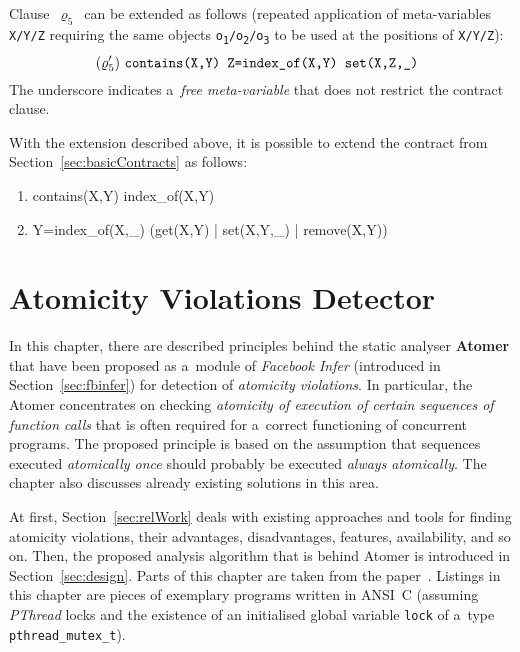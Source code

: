 Clause~$ \varrho_5 $~can be extended as follows (repeated application of
meta-variables \texttt{X/Y/Z} requiring the same objects
\texttt{o\textsubscript{1}/o\textsubscript{2}/o\textsubscript{3}} to be used
at the positions of \texttt{X/Y/Z}):
$$
    (\varrho'_5)\ \text{\texttt{%
        contains(X,Y) Z=index\_of(X,Y) set(X,Z,\_)
    }}
$$
The underscore indicates a~\emph{free meta-variable} that does not restrict
the contract clause.

With the extension described above, it is possible to extend the contract
from Section~\ref{sec:basicContracts} as follows:
\begin{enumerate}[label={$ (\varrho'_{\arabic*}) $}]
    \tt

    \item contains(X,Y) index\_of(X,Y)
    \item Y=index\_of(X,\_) (get(X,Y) | set(X,Y,\_) | remove(X,Y))
\end{enumerate}



\chapter{Atomicity Violations Detector}
\label{chap:proposal}

In this chapter, there are described principles behind the static analyser
\textbf{Atomer} that have been proposed as a~module of \emph{Facebook
Infer} (introduced in Section~\ref{sec:fbinfer}) for detection of
\emph{atomicity violations}. In particular, the Atomer concentrates on
checking \emph{atomicity of execution of certain sequences of function
calls} that is often required for a~correct functioning of concurrent
programs. The proposed principle is based on the assumption that sequences
executed \emph{atomically once} should probably be executed \emph{always
atomically}. The chapter also discusses already existing solutions in this
area.

At first, Section~\ref{sec:relWork} deals with
existing approaches and tools for finding atomicity violations, their
advantages, disadvantages, features, availability, and so on. Then,
the proposed analysis algorithm that is behind Atomer is introduced in
Section~\ref{sec:design}. Parts of this chapter are taken from the
paper~\cite{excel2019FBInfer}. Listings in this chapter are pieces of
exemplary programs written in ANSI~C (assuming \emph{PThread} locks and the
existence of an initialised global variable \texttt{lock} of a~type
\texttt{pthread\_mutex\_t}).


